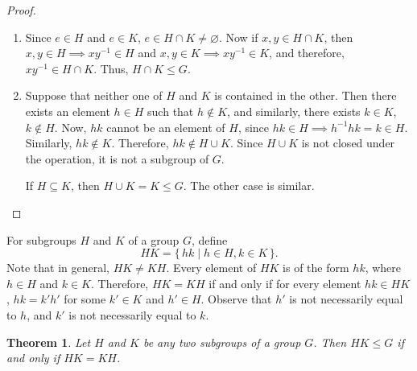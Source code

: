 \documentclass[svgnames]{article}
\newtheorem{Theorem}{Theorem}[section]
\theoremstyle{definition}
\theoremstyle{remark}
\begin{document}
\begin{proof}
\begin{enumerate}
\item Since $e \in H$ and $e \in K$, $e \in H \cap K \ne \varnothing$. Now if $x, y \in H \cap K$, then $x, y \in H \implies xy^{-1} \in H$ and $x, y \in K \implies xy^{-1} \in K$, and therefore, $xy^{-1} \in H \cap K$. Thus, $H \cap K \le G$.

\item Suppose that neither one of $H$ and $K$ is contained in the other. Then there exists an element $h \in H$ such that $h \notin K$, and similarly, there exists $k \in K$, $k \notin H$. Now, $hk$ cannot be an element of $H$, since $hk \in H \implies h^{-1}hk = k \in H$. Similarly, $hk \notin K$. Therefore, $hk \notin H \cup K$. Since $H \cup K$ is not closed under the operation, it is not a subgroup of $G$.

If $H \subseteq K$, then $H \cup K = K \le G$. The other case is similar.
\end{enumerate}
\end{proof}

\label{def:HK} For subgroups $H$ and $K$ of a group $G$, define
\begin{equation*}
HK = \{\, hk \mid h \in H, k \in K \,\}.
\end{equation*}
Note that in general, $HK \ne KH$. Every element of $HK$ is of the form $hk$, where $h \in H$ and $k \in K$. Therefore, $HK = KH$ if and only if for every element $hk \in HK$, $hk = k'h'$ for some $k' \in K$ and $h' \in H$. Observe that $h'$ is not necessarily equal to $h$, and $k'$ is not necessarily equal to $k$.

\begin{Theorem}\label{thm:HK}
Let $H$ and $K$ be any two subgroups of a group $G$. Then $HK \le G$ if and only if $HK = KH$.
\end{Theorem}
\end{document}

